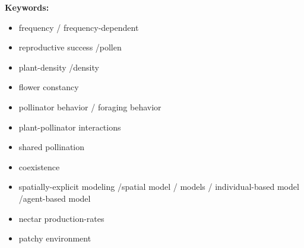 \documentclass{article}
\begin{document}
\textbf{Keywords:}
\begin{itemize}
\item  frequency / frequency-dependent 
\item reproductive success /pollen
\item plant-density /density
\item flower constancy
\item pollinator behavior / foraging behavior
\item plant-pollinator interactions
\item shared pollination
\item coexistence
\item spatially-explicit modeling /spatial model / models / individual-based model /agent-based model
\item nectar production-rates
\item patchy environment

\end{itemize}

\newpage

%

\newpage



\newpage


\newpage


\newpage


\newpage


\newpage





\newpage




\newpage

%

\newpage



\newpage



%
\end{document}
